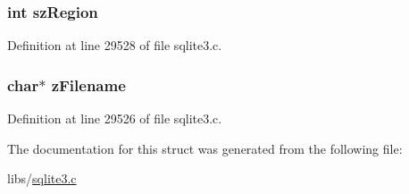 \hypertarget{structunix_shm_node_acf8ce64e80f5d391b8d68cc6a1d306c5}{}
\subsubsection[{sz\+Region}]{\setlength{\rightskip}{0pt plus 5cm}int sz\+Region}\label{structunix_shm_node_acf8ce64e80f5d391b8d68cc6a1d306c5}


Definition at line 29528 of file sqlite3.\+c.

\hypertarget{structunix_shm_node_a47b2dee2615c9bcdc2d8b755dc571e35}{}
\subsubsection[{z\+Filename}]{\setlength{\rightskip}{0pt plus 5cm}char$\ast$ z\+Filename}\label{structunix_shm_node_a47b2dee2615c9bcdc2d8b755dc571e35}


Definition at line 29526 of file sqlite3.\+c.



The documentation for this struct was generated from the following file\+:\begin{DoxyCompactItemize}
\item 
libs/\hyperlink{sqlite3_8c}{sqlite3.\+c}\end{DoxyCompactItemize}
